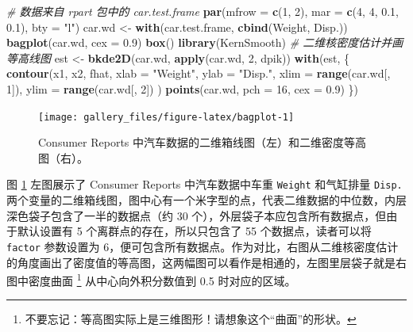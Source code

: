 \documentclass[
  b5paper,
  UTF8,twoside]{book}
\newenvironment{Shaded}{\begin{snugshade}}{\end{snugshade}}
\newcommand{\AttributeTok}[1]{\textcolor[rgb]{0.13,0.29,0.53}{#1}}
\newcommand{\CommentTok}[1]{\textcolor[rgb]{0.56,0.35,0.01}{\textit{#1}}}
\newcommand{\DecValTok}[1]{\textcolor[rgb]{0.00,0.00,0.81}{#1}}
\newcommand{\FloatTok}[1]{\textcolor[rgb]{0.00,0.00,0.81}{#1}}
\newcommand{\FunctionTok}[1]{\textcolor[rgb]{0.13,0.29,0.53}{\textbf{#1}}}
\newcommand{\NormalTok}[1]{#1}
\newcommand{\OtherTok}[1]{\textcolor[rgb]{0.56,0.35,0.01}{#1}}
\newcommand{\StringTok}[1]{\textcolor[rgb]{0.31,0.60,0.02}{#1}}
\begin{document}
\begin{Shaded}
\begin{Highlighting}[]
\CommentTok{\# 数据来自 rpart 包中的 car.test.frame}
\FunctionTok{par}\NormalTok{(}\AttributeTok{mfrow =} \FunctionTok{c}\NormalTok{(}\DecValTok{1}\NormalTok{, }\DecValTok{2}\NormalTok{), }\AttributeTok{mar =} \FunctionTok{c}\NormalTok{(}\DecValTok{4}\NormalTok{, }\DecValTok{4}\NormalTok{, }\FloatTok{0.1}\NormalTok{, }\FloatTok{0.1}\NormalTok{), }\AttributeTok{bty =} \StringTok{"l"}\NormalTok{)}
\NormalTok{car.wd }\OtherTok{\textless{}{-}} \FunctionTok{with}\NormalTok{(car.test.frame, }\FunctionTok{cbind}\NormalTok{(Weight, Disp.))}
\FunctionTok{bagplot}\NormalTok{(car.wd, }\AttributeTok{cex =} \FloatTok{0.9}\NormalTok{)}
\FunctionTok{box}\NormalTok{()}
\FunctionTok{library}\NormalTok{(KernSmooth) }\CommentTok{\# 二维核密度估计并画等高线图}
\NormalTok{est }\OtherTok{\textless{}{-}} \FunctionTok{bkde2D}\NormalTok{(car.wd, }\FunctionTok{apply}\NormalTok{(car.wd, }\DecValTok{2}\NormalTok{, dpik))}
\FunctionTok{with}\NormalTok{(est, \{}
  \FunctionTok{contour}\NormalTok{(x1, x2, fhat,}
    \AttributeTok{xlab =} \StringTok{"Weight"}\NormalTok{, }\AttributeTok{ylab =} \StringTok{"Disp."}\NormalTok{,}
    \AttributeTok{xlim =} \FunctionTok{range}\NormalTok{(car.wd[, }\DecValTok{1}\NormalTok{]),}
    \AttributeTok{ylim =} \FunctionTok{range}\NormalTok{(car.wd[, }\DecValTok{2}\NormalTok{])}
\NormalTok{  )}
  \FunctionTok{points}\NormalTok{(car.wd, }\AttributeTok{pch =} \DecValTok{16}\NormalTok{, }\AttributeTok{cex =} \FloatTok{0.9}\NormalTok{)}
\NormalTok{\})}
\end{Highlighting}
\end{Shaded}

\begin{figure}

{\centering \texttt{[image: gallery\_files/figure-latex/bagplot-1]} 

}

\caption[Consumer Reports 中汽车数据的二维箱线图和密度等高图]{Consumer Reports 中汽车数据的二维箱线图（左）和二维密度等高图（右）。}\label{fig:bagplot}
\end{figure}

图 \ref{fig:bagplot} 左图展示了 Consumer Reports 中汽车数据中车重 \texttt{Weight} 和气缸排量 \texttt{Disp.} 两个变量的二维箱线图，图中心有一个米字型的点，代表二维数据的中位数，内层深色袋子包含了一半的数据点（约 30 个），外层袋子本应包含所有数据点，但由于默认设置有 5 个离群点的存在，所以只包含了 55 个数据点，读者可以将 \texttt{factor} 参数设置为 6，便可包含所有数据点。作为对比，右图从二维核密度估计的角度画出了密度值的等高图，这两幅图可以看作是相通的，左图里层袋子就是右图中密度曲面 \footnote{不要忘记：等高图实际上是三维图形！请想象这个``曲面''的形状。} 从中心向外积分数值到 0.5 时对应的区域。
\end{document}
